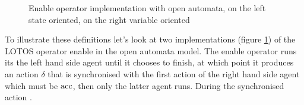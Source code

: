 \documentclass{article}
\begin{document}
\begin{figure}
\centering

\vrule

\caption{Enable operator implementation with open automata, on the left state oriented, on the right variable oriented}
\label{fig:enable}
\end{figure}
To illustrate these definitions let's look at two implementations (figure \ref{fig:enable}) of the LOTOS operator enable in the open automata model.
The enable operator runs its the left hand side agent until it chooses to finish, at which point it produces an action \(\delta\) that is synchronised with the first action of the right hand side agent which must be \(\mathrm{acc}\), then only the latter agent runs.
During the synchronised action .
\end{document}
